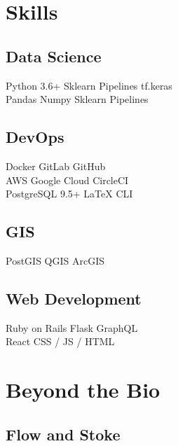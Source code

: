 \documentclass[letterpaper]{deedy-resume} %
\begin{document}
\begin{minipage}[t]{0.33\textwidth}
\sectionspace %



\section{Skills}

\subsection{Data Science}

Python 3.6+ \textbullet{} Sklearn Pipelines \textbullet{} tf.keras\\
Pandas \textbullet{} Numpy \textbullet{} Sklearn Pipelines \\

\subsection{DevOps}
Docker \textbullet{} GitLab \textbullet{} GitHub \\ 
AWS \textbullet{} Google Cloud \textbullet{} CircleCI  \\
PostgreSQL 9.5+ \textbullet{} \LaTeX \textbullet{} CLI\\

\subsection{GIS}
PostGIS \textbullet{} QGIS \textbullet{} ArcGIS 

\subsection{Web Development}
Ruby on Rails \textbullet{} Flask \textbullet{} GraphQL \\
React \textbullet{} CSS / JS / HTML

\sectionspace %


\section{Beyond the Bio}

\subsection{Flow and Stoke}


\end{minipage}
\end{document}
